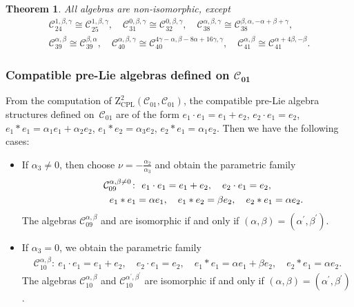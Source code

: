 \documentclass[10pt,a4paper]{amsart}
\numberwithin{equation}{section}
\newtheorem{Theorem}{Theorem}[section]
\begin{document}
\begin{Theorem}
All algebras are non-isomorphic, except
\begin{gather*}
\mathcal{C}_{24}^{1 ,\beta ,\gamma } \cong \mathcal{C}_{25}^{1 , \beta ,\gamma },\quad
\mathcal{C}_{31}^{0 ,\beta ,\gamma } \cong \mathcal{C}_{32}^{0 , \beta ,\gamma },\quad
\mathcal{C}_{38}^{\alpha ,\beta ,\gamma } \cong \mathcal{C}_{38}^{\beta ,\alpha , -\alpha +\beta +\gamma }, \\
 \mathcal{C}_{39}^{\alpha ,\beta } \cong \mathcal{C}_{39}^{\beta,\alpha},\quad
\mathcal{C}_{40}^{\alpha ,\beta ,\gamma } \cong \mathcal{C}_{40}^{4\gamma -\alpha ,\beta
-8\alpha +16\gamma ,\gamma },\quad
 \mathcal{C}_{41}^{\alpha ,\beta } \cong \mathcal{C}%
_{41}^{ \alpha +4\beta ,-\beta }.
\end{gather*}
\end{Theorem}

\subsubsection[Compatible pre-Lie algebras defined on C\_\{01\}]{Compatible pre-Lie algebras defined on $\boldsymbol{\mathcal{C}_{01}}$}

From the computation of $\mathrm{Z}_{\mathrm{CPL}}^{2}(\mathcal{C}_{01},%
\mathcal{C}_{01})$, the compatible pre-Lie algebra structures defined on~$%
\mathcal{C}_{01}$ are of the form
$e_{1}\cdot e_{1}=e_{1}+e_{2}$, $ e_{2}\cdot e_{1}=e_{2}$, $e_{1}\ast e_{1}=\alpha _{1}e_{1}+\alpha _{2}e_{2}$, $e_{1}\ast
e_{2}=\alpha _{3}e_{2}$, $e_{2}\ast e_{1}=\alpha _{1}e_{2}$.
Then we have the following cases:
\begin{itemize}\itemsep=0pt
\item If $\alpha _{3}\neq 0$, then choose $\nu =-\frac{\alpha _{2}}{\alpha
_{3}}$ and obtain the parametric family
\begin{gather*}
\mathcal{C}_{09}^{\alpha ,\beta \neq 0} \colon \
e_{1}\cdot e_{1}=e_{1}+e_{2},\quad e_{2}\cdot e_{1}=e_{2},\\
\hphantom{\mathcal{C}_{09}^{\alpha ,\beta \neq 0} \colon} \ e_{1}\ast e_{1}=\alpha e_{1},\quad e_{1}\ast e_{2}=\beta e_{2},\quad
e_{2}\ast e_{1}=\alpha e_{2}.
\end{gather*}
The algebras $\mathcal{C}_{09}^{\alpha ,\beta }$ and \smash{$\mathcal{C}_{09}^{\alpha
^{\prime },\beta ^{\prime }}$} are isomorphic if and only if $(\alpha,\beta)= (\alpha^{\prime },\beta ^{\prime })$.

\item If $\alpha _{3}=0$, we obtain the parametric family
\begin{gather*}
\mathcal{C}_{10}^{\alpha ,\beta }\colon \
e_{1}\cdot e_{1}=e_{1}+e_{2},\quad e_{2}\cdot e_{1}=e_{2}, \quad e_{1}\ast e_{1}=\alpha e_{1}+\beta e_{2},\quad e_{2}\ast e_{1}=\alpha e_{2}.
\end{gather*}
The algebras $\mathcal{C}_{10}^{\alpha ,\beta }$ and $\mathcal{C}_{10}^{\alpha
^{\prime },\beta ^{\prime }}$ are isomorphic if and only if $(\alpha,\beta)= (\alpha^{\prime },\beta ^{\prime })$.
\end{itemize}
\end{document}
